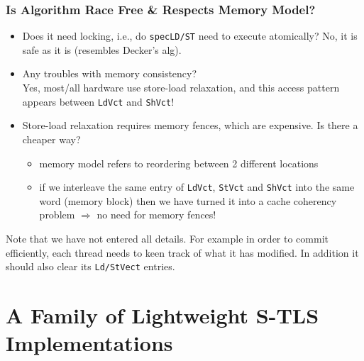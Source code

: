 \documentclass{beamer}
\newcommand{\emp}[1]{\textcolor{DikuRed}{ #1}}
\newcommand{\emphh}[1]{\textcolor{CosGreen}{ #1}}
\begin{document}
\begin{frame}[fragile,t]
  \frametitle{Is Algorithm Race Free \& Respects Memory Model?}

\begin{itemize}
\item \emp{Does it need locking}, i.e., do {\tt specLD/ST} need to execute atomically?\pause
        \emphh{No, it is safe as it is (resembles Decker's alg).}\medskip

\item \emp{Any troubles with memory consistency?}\pause\\
    \alert{Yes}, most/all hardware use store-load relaxation, and this
        access pattern appears between \alert{{\tt LdVct} and {\tt ShVct}}!\medskip

\item Store-load relaxation requires memory fences, which are expensive.
        \alert{Is there a cheaper way?}\pause\medskip
\begin{itemize}
    \item memory model refers to reordering between 2 different locations
    \item if we interleave the same entry of {\tt LdVct}, {\tt StVct}
            and {\tt ShVct} into the same word (memory block) then
            we have turned it into a cache coherency problem $\Rightarrow$
            no need for memory fences! 
\end{itemize}
\end{itemize}\bigskip

Note that we have not entered all details. For example in order to commit
efficiently, each thread needs to keen track of what it has modified.
In addition it should also clear its {\tt Ld/StVect} entries.

\end{frame}


\section{A Family of Lightweight S-TLS Implementations}

\begin{frame}[fragile]
	\tableofcontents[currentsection]
\end{frame}
\end{document}
